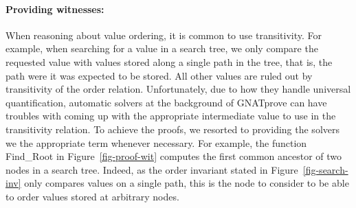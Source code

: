 \documentclass[11pt,a4paper]{article}
\begin{document}
\paragraph{Providing witnesses:}
When reasoning about value ordering, it is common to use transitivity. For example, when searching for
a value in a search tree, we only compare the requested value with values stored along a single path in
the tree, that is, the path were it was expected to be stored. All other values are ruled out by
transitivity of the order relation. Unfortunately, due to how they handle universal quantification,
automatic solvers at the background of GNATprove can have troubles with coming up with the appropriate
intermediate value to use in the transitivity relation. To achieve the proofs, we resorted to providing
the solvers we the appropriate term whenever necessary. For example, the function Find\_Root in
Figure~\ref{fig-proof-wit} computes the first common ancestor of two nodes in a search tree. Indeed, as
the order invariant stated in Figure~\ref{fig-search-inv} only compares values on a single path, this
is the node to consider to be able to order values stored at arbitrary nodes.
\end{document}
